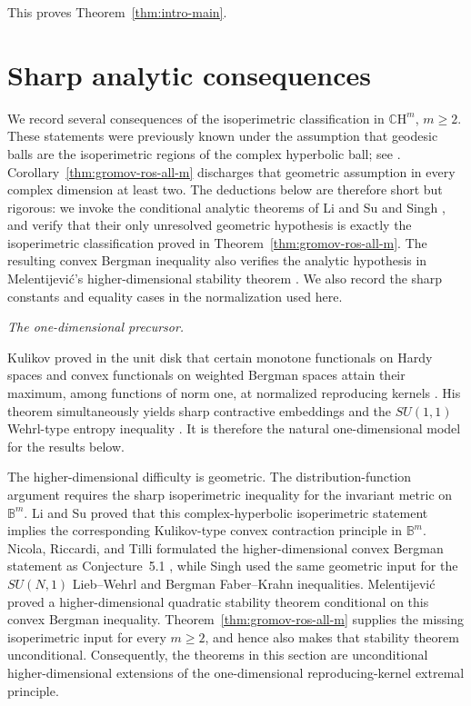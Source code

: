 \documentclass[11pt,reqno]{amsart}
\numberwithin{equation}{section}
\theoremstyle{definition}
\theoremstyle{remark}
\newcommand{\CH}{\mathbb{C}\mathrm{H}}
\newcommand{\ithead}[1]{%
  \par\medskip\noindent\textit{#1}\enspace
}
\begin{document}
This proves Theorem~\ref{thm:intro-main}.

\section{Sharp analytic consequences}\label{sec:analytic-consequences}

We record several consequences of the isoperimetric classification in
$\CH^m$, \(m\ge2\).  These statements were previously known under the
assumption that geodesic balls are the isoperimetric regions of the complex
hyperbolic ball; see \cite{LiSu2025,Singh2026}.  Corollary~\ref{thm:gromov-ros-all-m} discharges that geometric assumption
in every complex dimension at least two.  The deductions below are therefore short but rigorous: we invoke
the conditional analytic theorems of Li and Su \cite{LiSu2025} and Singh
\cite{Singh2026}, and verify that their only unresolved geometric hypothesis
is exactly the isoperimetric classification proved in
Theorem~\ref{thm:gromov-ros-all-m}.
The resulting convex Bergman inequality also verifies the analytic
hypothesis in Melentijevi\'c's higher-dimensional stability theorem
\cite[Theorem~4]{Melentijevic2025}.
We also record the sharp constants and
equality cases in the normalization used here.

\ithead{The one-dimensional precursor.}
Kulikov proved in the unit disk that certain monotone functionals on Hardy
spaces and convex functionals on weighted Bergman spaces attain their
maximum, among functions of norm one, at normalized reproducing kernels
\cite{Kulikov2022}.  His theorem simultaneously yields sharp contractive
embeddings and the $SU(1,1)$ Wehrl-type entropy inequality
\cite{LiebSolovej2021}. It is therefore
the natural one-dimensional model for the results below.

The higher-dimensional difficulty is geometric.  The distribution-function
argument requires the sharp isoperimetric inequality for the invariant
metric on $\mathbb B^m$. Li and Su \cite{LiSu2025} proved that this
complex-hyperbolic isoperimetric statement implies the corresponding
Kulikov-type convex contraction principle in $\mathbb B^m$. Nicola,
Riccardi, and Tilli formulated the higher-dimensional convex Bergman
statement as Conjecture~5.1
\cite[Section~5]{NicolaRiccardiTilli2025}, while Singh \cite{Singh2026}
used the same geometric input for the $SU(N,1)$ Lieb--Wehrl and Bergman
Faber--Krahn inequalities.  Melentijevi\'c
\cite[Theorem~4]{Melentijevic2025} proved a higher-dimensional quadratic
stability theorem conditional on this convex Bergman inequality.
Theorem~\ref{thm:gromov-ros-all-m}
supplies the missing isoperimetric input for every \(m\ge2\), and hence also
makes that stability theorem unconditional.
Consequently, the theorems in this section are
unconditional higher-dimensional extensions of the one-dimensional
reproducing-kernel extremal principle.
\end{document}
